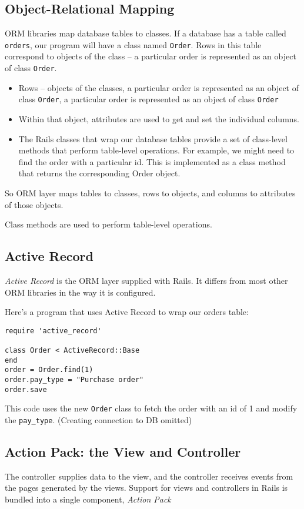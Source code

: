 \documentclass[11pt, a4paper]{book}
\begin{document}
\subsection{Object-Relational Mapping}
ORM libraries map database tables to classes. If a database has a table called
\verb|orders|, our program will have a class named \verb|Order|. Rows in this
table correspond to objects of the class -- a particular order is represented as
an object of class \verb|Order|.
\begin{itemize}
\item Rows -- objects of the classes, a particular order is represented as an
object of class \verb|Order|, a particular order is represented as an object of
class \verb|Order|
\item Within that object, attributes are used to get and set the individual
columns.
\item The Rails classes that wrap our database tables provide a set of
class-level methods that perform table-level operations. For example, we might
need to find the order with a particular id. This is implemented as a class
method that returns the corresponding Order object.
\end{itemize}

So ORM layer maps tables to classes, rows to objects, and columns to attributes
of those objects.

Class methods are used to perform table-level operations.
\subsection{Active Record}
\emph{Active Record} is the ORM layer supplied with Rails. It differs from most
other ORM libraries in the way it is configured.

Here's a program that uses Active Record to wrap our orders table:
\begin{verbatim}
require 'active_record'

class Order < ActiveRecord::Base
end
order = Order.find(1)
order.pay_type = "Purchase order"
order.save
\end{verbatim}

This code uses the new \verb|Order| class to fetch the order with an id of 1 and
modify the \verb|pay_type|. (Creating connection to DB omitted)

\subsection{Action Pack: the View and Controller}
The controller supplies data to the view, and the controller receives events
from the pages generated by the views. Support for views and controllers in
Rails is bundled into a single component, \emph{Action Pack}
\end{document}
